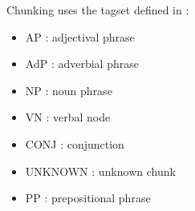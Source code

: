 \documentclass[manual-fr.tex]{subfiles}
\begin{document}
Chunking uses the tagset defined in \cite{Tellier2012} :\\

\begin{minipage}{0.49\linewidth}
\begin{itemize}
	\item[] AP : adjectival phrase
	\item[] AdP : adverbial phrase
	\item[] NP : noun phrase
	\item[] VN : verbal node
\end{itemize}
\end{minipage}
\begin{minipage}{0.49\linewidth}
\begin{itemize}
	\item[] CONJ : conjunction
	\item[] UNKNOWN : unknown chunk
	\item[] PP : prepositional phrase
\end{itemize}
\end{minipage}
\end{document}
